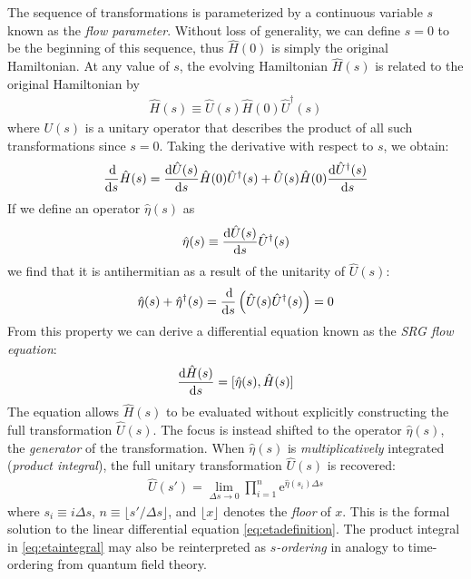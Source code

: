 The sequence of transformations is parameterized by a continuous variable $s$ known as the \textit{flow parameter}.  Without loss of generality, we can define $s = 0$ to be the beginning of this sequence, thus $\hat{H}(0)$ is simply the original Hamiltonian.  At any value of $s$, the evolving Hamiltonian $\hat{H}(s)$ is related to the original Hamiltonian by
\begin{align*}
  \hat{H}(s) \equiv \hat{U}(s) \hat{H}(0) \hat{U}^\dagger(s)
\end{align*}
where $U(s)$ is a unitary operator that describes the product of all such
transformations since $s = 0$.  Taking the derivative with respect to $s$, we obtain:
\begin{align*}
  \frac{\operatorname{d\!}}{\operatorname{d\!} s} \hat{H}(s) = \frac{\operatorname{d\!} \hat{U}(s)}{\operatorname{d\!} s} \hat{H}(0) \hat{U}^\dagger(s) + \hat{U}(s) \hat{H}(0) \frac{\operatorname{d\!} \hat{U}^\dagger (s)}{\operatorname{d\!} s}
\end{align*}
If we define an operator $\hat{\eta}(s)$ as
\begin{align} \label{eq:etadefinition}
  \hat{\eta}(s) \equiv \frac{\operatorname{d\!} \hat{U}(s)}{\operatorname{d\!} s} \hat{U}^\dagger(s)
\end{align}
we find that it is antihermitian as a result of the unitarity of $\hat{U}(s)$:
\begin{align*}
  \hat{\eta}(s) + \hat{\eta}^\dagger(s)
  = \frac{\operatorname{d\!}}{\operatorname{d\!} s} \left(\hat{U}(s) \hat{U}^\dagger(s)\right)
  = 0
\end{align*}
From this property we can derive a differential equation known as the \textit{SRG flow equation}:
\begin{align} \label{eq:imsrgode}
  \frac{\operatorname{d\!} \hat{H}(s)}{\operatorname{d\!} s} = [\hat{\eta}(s), \hat{H}(s)]
\end{align}
The equation allows $\hat{H}(s)$ to be evaluated without explicitly constructing the full transformation $\hat U(s)$.  The focus is instead shifted to the operator $\hat \eta(s)$, the \textit{generator} of the transformation.  When $\hat \eta(s)$ is \emph{multiplicatively} integrated (\textit{product integral}), the full unitary transformation $\hat U(s)$ is recovered:
\begin{align} \label{eq:etaintegral}
  \hat U(s')
  = \lim_{\Delta s \to 0} \prod_{i = 1}^n \mathrm{e}^{\hat{\eta}(s_i) \Delta s}
\end{align}
where $s_i \equiv i \Delta s$, $n \equiv \lfloor s' / \Delta s \rfloor$, and $\lfloor x \rfloor$ denotes the \textit{floor} of $x$.  This is the formal solution to the linear differential equation \ref{eq:etadefinition}.  The product integral in \ref{eq:etaintegral} may also be reinterpreted as \textit{$s$-ordering} \cite[\S 6.1]{reimann2013quantum} in analogy to time-ordering from quantum field theory.


